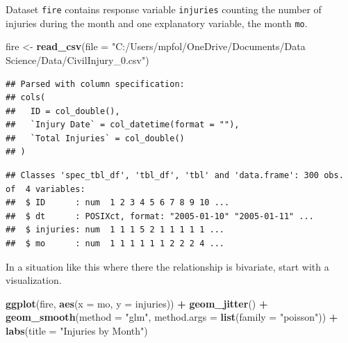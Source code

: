 \documentclass[
]{book}
\newenvironment{Shaded}{\begin{snugshade}}{\end{snugshade}}
\newcommand{\DataTypeTok}[1]{\textcolor[rgb]{0.13,0.29,0.53}{#1}}
\newcommand{\DecValTok}[1]{\textcolor[rgb]{0.00,0.00,0.81}{#1}}
\newcommand{\KeywordTok}[1]{\textcolor[rgb]{0.13,0.29,0.53}{\textbf{#1}}}
\newcommand{\NormalTok}[1]{#1}
\newcommand{\OperatorTok}[1]{\textcolor[rgb]{0.81,0.36,0.00}{\textbf{#1}}}
\newcommand{\StringTok}[1]{\textcolor[rgb]{0.31,0.60,0.02}{#1}}
\begin{document}
Dataset \texttt{fire} contains response variable \texttt{injuries} counting the number of injuries during the month and one explanatory variable, the month \texttt{mo}.

\begin{Shaded}
\begin{Highlighting}[]
\NormalTok{fire <-}\StringTok{ }\KeywordTok{read_csv}\NormalTok{(}\DataTypeTok{file =} \StringTok{"C:/Users/mpfol/OneDrive/Documents/Data Science/Data/CivilInjury_0.csv"}\NormalTok{)}
\end{Highlighting}
\end{Shaded}

\begin{verbatim}
## Parsed with column specification:
## cols(
##   ID = col_double(),
##   `Injury Date` = col_datetime(format = ""),
##   `Total Injuries` = col_double()
## )
\end{verbatim}

\begin{Shaded}
\end{Shaded}

\begin{verbatim}
## Classes 'spec_tbl_df', 'tbl_df', 'tbl' and 'data.frame': 300 obs. of  4 variables:
##  $ ID      : num  1 2 3 4 5 6 7 8 9 10 ...
##  $ dt      : POSIXct, format: "2005-01-10" "2005-01-11" ...
##  $ injuries: num  1 1 1 5 2 1 1 1 1 1 ...
##  $ mo      : num  1 1 1 1 1 1 2 2 2 4 ...
\end{verbatim}

In a situation like this where there the relationship is bivariate, start with a visualization.

\begin{Shaded}
\begin{Highlighting}[]
\KeywordTok{ggplot}\NormalTok{(fire, }\KeywordTok{aes}\NormalTok{(}\DataTypeTok{x =}\NormalTok{ mo, }\DataTypeTok{y =}\NormalTok{ injuries)) }\OperatorTok{+}
\StringTok{  }\KeywordTok{geom_jitter}\NormalTok{() }\OperatorTok{+}
\StringTok{  }\KeywordTok{geom_smooth}\NormalTok{(}\DataTypeTok{method =} \StringTok{"glm"}\NormalTok{, }\DataTypeTok{method.args =} \KeywordTok{list}\NormalTok{(}\DataTypeTok{family =} \StringTok{"poisson"}\NormalTok{)) }\OperatorTok{+}
\StringTok{  }\KeywordTok{labs}\NormalTok{(}\DataTypeTok{title =} \StringTok{"Injuries by Month"}\NormalTok{)}
\end{Highlighting}
\end{Shaded}
\end{document}
